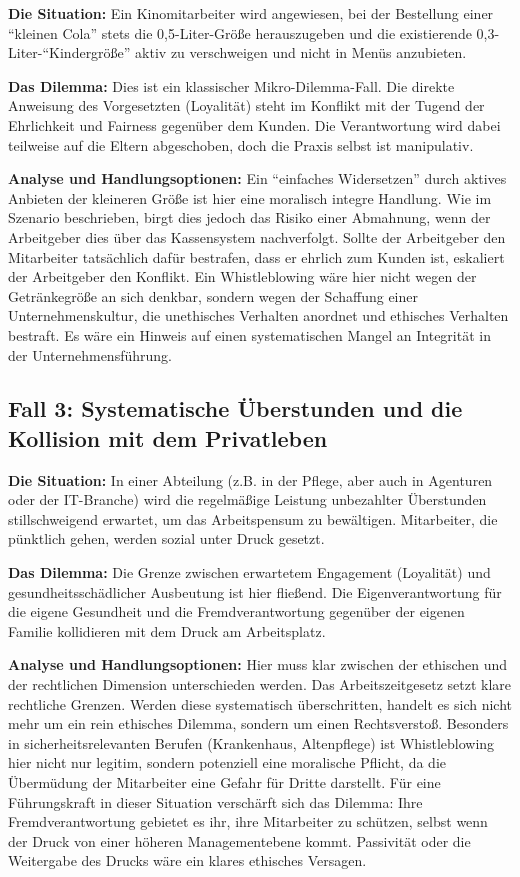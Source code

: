 \documentclass[
    12pt,               %
    a4paper,            %
    ngerman             %
]{scrartcl}
\begin{document}
\textbf{Die Situation:} Ein Kinomitarbeiter wird angewiesen, bei der Bestellung einer \enquote{kleinen Cola} stets die 0,5-Liter-Größe herauszugeben und die existierende 0,3-Liter-\enquote{Kindergröße} aktiv zu verschweigen und nicht in Menüs anzubieten.

\textbf{Das Dilemma:} Dies ist ein klassischer Mikro-Dilemma-Fall. Die direkte Anweisung des Vorgesetzten (Loyalität) steht im Konflikt mit der Tugend der Ehrlichkeit und Fairness gegenüber dem Kunden. Die Verantwortung wird dabei teilweise auf die Eltern abgeschoben, doch die Praxis selbst ist manipulativ.

\textbf{Analyse und Handlungsoptionen:} Ein \enquote{einfaches Widersetzen} durch aktives Anbieten der kleineren Größe ist hier eine moralisch integre Handlung. Wie im Szenario beschrieben, birgt dies jedoch das Risiko einer Abmahnung, wenn der Arbeitgeber dies über das Kassensystem nachverfolgt. Sollte der Arbeitgeber den Mitarbeiter tatsächlich dafür bestrafen, dass er ehrlich zum Kunden ist, eskaliert der Arbeitgeber den Konflikt. Ein Whistleblowing wäre hier nicht wegen der Getränkegröße an sich denkbar, sondern wegen der Schaffung einer Unternehmenskultur, die unethisches Verhalten anordnet und ethisches Verhalten bestraft. Es wäre ein Hinweis auf einen systematischen Mangel an Integrität in der Unternehmensführung.

\subsection{Fall 3: Systematische Überstunden und die Kollision mit dem Privatleben}

\textbf{Die Situation:} In einer Abteilung (z.B. in der Pflege, aber auch in Agenturen oder der IT-Branche) wird die regelmäßige Leistung unbezahlter Überstunden stillschweigend erwartet, um das Arbeitspensum zu bewältigen. Mitarbeiter, die pünktlich gehen, werden sozial unter Druck gesetzt.

\textbf{Das Dilemma:} Die Grenze zwischen erwartetem Engagement (Loyalität) und gesundheitsschädlicher Ausbeutung ist hier fließend. Die Eigenverantwortung für die eigene Gesundheit und die Fremdverantwortung gegenüber der eigenen Familie kollidieren mit dem Druck am Arbeitsplatz.

\textbf{Analyse und Handlungsoptionen:} Hier muss klar zwischen der ethischen und der rechtlichen Dimension unterschieden werden. Das Arbeitszeitgesetz setzt klare rechtliche Grenzen. Werden diese systematisch überschritten, handelt es sich nicht mehr um ein rein ethisches Dilemma, sondern um einen Rechtsverstoß. Besonders in sicherheitsrelevanten Berufen (Krankenhaus, Altenpflege) ist Whistleblowing hier nicht nur legitim, sondern potenziell eine moralische Pflicht, da die Übermüdung der Mitarbeiter eine Gefahr für Dritte darstellt. Für eine Führungskraft in dieser Situation verschärft sich das Dilemma: Ihre Fremdverantwortung gebietet es ihr, ihre Mitarbeiter zu schützen, selbst wenn der Druck von einer höheren Managementebene kommt. Passivität oder die Weitergabe des Drucks wäre ein klares ethisches Versagen.
\end{document}
